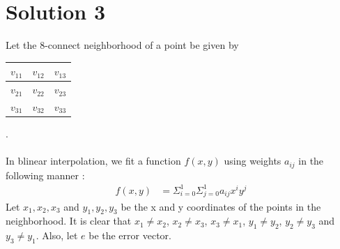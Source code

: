 \documentclass[a4paper,fleqn,11pt]{article}
\theoremstyle{mytheor}
\begin{document}
\section*{Solution 3}
Let the 8-connect neighborhood of a point be given by
\begin{tabular}{| c | c | c |}
	\hline
	$v_{11}$	& $v_{12}$ 	& $v_{13}$ \\
	\hline
	$v_{21}$	& $v_{22}$ 	& $v_{23}$\\
	\hline
	$v_{31}$ 	& $v_{32}$  & $v_{33}$ \\
	\hline
\end{tabular}. \\ \\
In blinear interpolation, we fit a function $f(x, y)$ using weights $a_{ij}$ in the following manner :
\begin{align}
f(x, y) & = \Sigma_{i = 0}^1\Sigma_{j = 0}^1 a_{ij}x^i y^j
\end{align}
Let $x_1, x_2, x_3$ and $y_1, y_2, y_3$ be the x and y coordinates of the points in the neighborhood. It is clear that $x_1 \neq x_2$, $x_2 \neq x_3$, $x_3 \neq x_1$, $y_1 \neq y_2$, $y_2 \neq y_3$ and $y_3 \neq y_1$. Also, let $e$ be the error vector.
\end{document}

